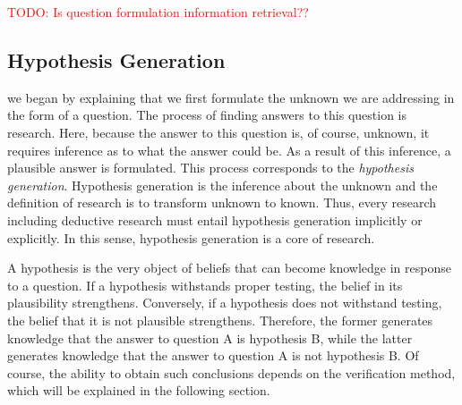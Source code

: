 \documentclass{book}
\begin{document}
\textcolor{red}{TODO: Is question formulation information retrieval??}





\subsection{Hypothesis Generation}
we began by explaining that we first formulate the unknown we are addressing in the form of a question. The process of finding answers to this question is research. Here, because the answer to this question is, of course, unknown, it requires inference as to what the answer could be. As a result of this inference, a plausible answer is formulated. This process corresponds to the \textit{hypothesis generation}. Hypothesis generation is the inference about the unknown and the definition of research is to transform unknown to known. Thus, every research including deductive research must entail hypothesis generation implicitly or explicitly. In this sense, hypothesis generation is a core of research.

A hypothesis is the very object of beliefs that can become knowledge in response to a question. If a hypothesis withstands proper testing, the belief in its plausibility strengthens. Conversely, if a hypothesis does not withstand testing, the belief that it is not plausible strengthens. Therefore, the former generates knowledge that the answer to question A is hypothesis B, while the latter generates knowledge that the answer to question A is not hypothesis B. Of course, the ability to obtain such conclusions depends on the verification method, which will be explained in the following section.
\end{document}

